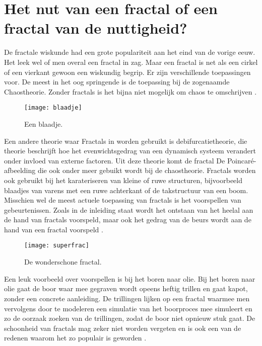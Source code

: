 \documentclass[11pt,fleqn]{book} %
\begin{document}
\section{Het nut van een fractal of een fractal van de nuttigheid?}
De fractale wiskunde had een grote populariteit aan het eind van de vorige eeuw. Het leek wel of men overal een fractal in zag. Maar een fractal is net als een cirkel of een vierkant gewoon een wiskundig begrip. Er zijn verschillende toepassingen voor. De meest in het oog springende is de toepassing bij de zogenaamde Chaostheorie. Zonder fractals is het bijna niet mogelijk om chaos te omschrijven \cite{deterchaos}\cite{fracnuttig}.
\begin{figure}[h]
	\centering\texttt{[image: blaadje]}
	\caption{Een blaadje.}
	\label{fig:blaadje}
\end{figure}
Een andere theorie waar Fractals in worden gebruikt is debifurcatietheorie, die theorie beschrijft hoe het evenwichtsgedrag van een dynamisch systeem verandert onder invloed van externe factoren. Uit deze theorie komt de fractal De Poincaré-afbeelding die ook onder meer gebuikt wordt bij de chaostheorie. 
Fractals worden ook gebruikt bij het karateriseren van kleine of ruwe structuren, bijvoorbeeld blaadjes van varens met een ruwe achterkant of de takstructuur van een boom. Misschien wel de meest actuele toepassing van fractals is het voorspellen van gebeurtenissen. Zoals in de inleiding staat wordt het ontstaan van het heelal aan de hand van fractals voorspeld, maar ook het gedrag van de beurs wordt aan de hand van een fractal voorspeld \cite{opdebeurs}.
\begin{figure}[h]
	\centering\texttt{[image: superfrac]}
	\caption{De wonderschone fractal.}
	\label{fig:superfrac}
\end{figure} 
Een leuk voorbeeld over voorspellen is bij het boren naar olie. Bij het boren naar olie gaat de boor waar mee gegraven wordt opeens heftig trillen en gaat kapot, zonder een concrete aanleiding. De trillingen lijken op een fractal waarmee men vervolgens door te modeleren een simulatie van het boorproces mee simuleert en zo de oorzaak zoeken van de trillingen, zodat de boor niet opnieuw stuk gaat.
De schoonheid van fractals mag zeker niet worden vergeten en is ook een van de redenen waarom het zo populair is geworden \cite{fractoepassingen}.

\end{document}
